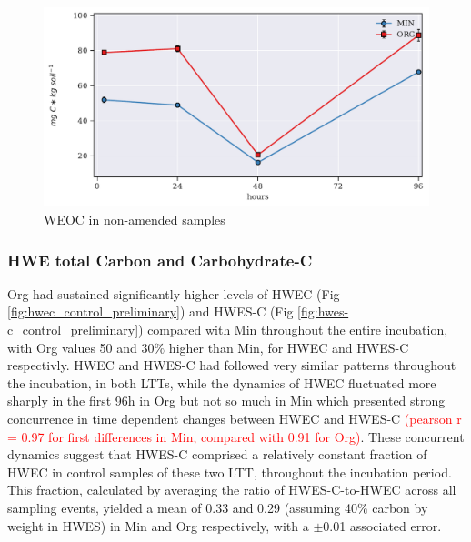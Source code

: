\documentclass[12pt]{report}
\newcommand{\myRed}[1]{\textcolor{red}{#1}} %
\begin{document}
        \begin{figure}[H]
        \centering
        \includegraphics[scale=0.8, ]{thesis_figures/preliminary/control/WEOC.pdf}
        \caption{WEOC in non-amended samples}
        \label{fig:weoc_control_preliminary}
         \end{figure}
  
  
   	\subsubsection{HWE total Carbon and Carbohydrate-C}
        
        Org had sustained significantly higher levels of HWEC (Fig \ref{fig:hwec_control_preliminary}) and HWES-C (Fig \ref{fig:hwes-c_control_preliminary}) compared with Min throughout the entire incubation, with Org values 50 and 30$\%$ higher than Min, for HWEC and HWES-C respectivly. HWEC and HWES-C had followed very similar patterns throughout the incubation, in both LTTs, while the dynamics of HWEC fluctuated more sharply in the first 96h in Org but not so much in Min which presented strong concurrence in time dependent changes between HWEC and HWES-C \myRed{(pearson r = 0.97 for first differences in Min, compared with 0.91 for Org)}. These concurrent dynamics suggest that HWES-C comprised a relatively constant fraction of HWEC in control samples of these two LTT, throughout the incubation period. This fraction, calculated by averaging the ratio of HWES-C-to-HWEC across all sampling events, yielded a mean of 0.33 and 0.29 (assuming 40$\%$ carbon by weight in HWES) in Min and Org respectively, with a $\pm$0.01 associated error.   
    
\end{document}
